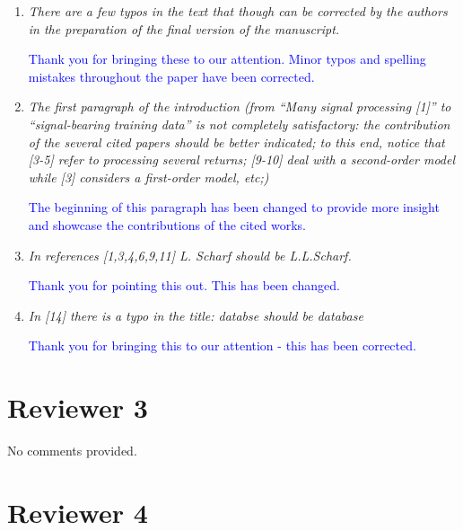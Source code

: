 \documentclass[11pt]{article}
\begin{document}
\begin{enumerate}
\item \textit{There are a few typos in the text that though can be corrected by the
    authors in the preparation of the final version of the manuscript.}

\textcolor{blue}{Thank you for bringing these to our attention. Minor typos and spelling
  mistakes throughout the paper have been corrected.}

\item \textit{The first paragraph of the introduction (from ``Many signal processing [1]''
    to ``signal-bearing training data'' is not completely satisfactory: the contribution
    of the several cited papers should be better indicated; to this end, notice that [3-5]
    refer to processing several returns; [9-10] deal with a second-order model while [3]
    considers a first-order model, etc;)}

\textcolor{blue}{The beginning of this paragraph has been changed to provide more insight
  and showcase the contributions of the cited works.}

\item \textit{In references [1,3,4,6,9,11] L. Scharf should be L.L.Scharf.}

\textcolor{blue}{Thank you for pointing this out. This has been changed.}

\item \textit{In [14] there is a typo in the title: databse should be database}

\textcolor{blue}{Thank you for bringing this to our attention - this has been corrected.}


\end{enumerate}

\section*{Reviewer 3}

No comments provided.

\section*{Reviewer 4}
\end{document}
